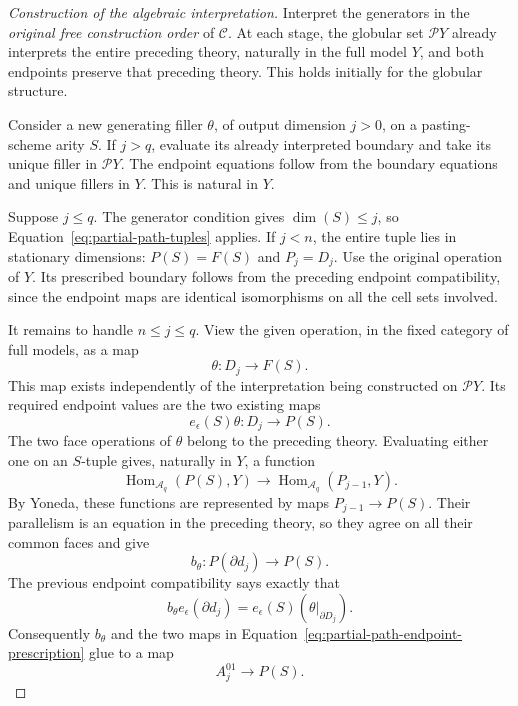 \documentclass[11pt,letterpaper]{article}
\numberwithin{equation}{section}
\theoremstyle{plain}
\theoremstyle{definition}
\theoremstyle{remark}
\DeclareMathOperator{\Hom}{Hom}
\begin{document}
\begin{proof}[Construction of the algebraic interpretation]
Interpret the generators in the \emph{original free construction order}
of \(\mathcal C\).  At each stage, the globular set
\(\mathcal P Y\) already interprets the entire preceding theory,
naturally in the full model \(Y\), and both endpoints preserve that
preceding theory.  This holds initially for the globular structure.

Consider a new generating filler \(\theta\), of output dimension
\(j>0\), on a pasting-scheme arity \(S\).  If \(j>q\),
evaluate its already interpreted boundary and take its unique filler
in \(\mathcal P Y\).  The endpoint equations follow from the
boundary equations and unique fillers in \(Y\).  This is natural
in \(Y\).

Suppose \(j\le q\).  The generator condition gives
\(\dim(S)\le j\), so Equation~\eqref{eq:partial-path-tuples}
applies.  If \(j<n\), the entire tuple lies in stationary
dimensions: \(P(S)=F(S)\) and \(P_j=D_j\).  Use the original
operation of \(Y\).  Its prescribed boundary follows from the
preceding endpoint compatibility, since the endpoint maps are identical
isomorphisms on all the cell sets involved.

It remains to handle \(n\le j\le q\).  View the given operation,
in the fixed category of full models, as a map
\[
                         \theta:D_j\longrightarrow F(S).
\]
This map exists independently of the interpretation being constructed
on \(\mathcal P Y\).  Its required endpoint values are the two
existing maps
\begin{equation}\label{eq:partial-path-endpoint-prescription}
             e_\epsilon(S)\theta:D_j\longrightarrow P(S).
\end{equation}
The two face operations of \(\theta\) belong to the preceding
theory.  Evaluating either one on an \(S\)-tuple gives, naturally
in \(Y\), a function
\[
 \Hom_{\mathcal A_q}(P(S),Y)
       \longrightarrow\Hom_{\mathcal A_q}(P_{j-1},Y).
\]
By Yoneda, these functions are represented by maps
\(P_{j-1}\to P(S)\).  Their parallelism is an equation in the
preceding theory, so they agree on all their common faces and give
\[
                 b_\theta:P(\partial d_j)\longrightarrow P(S).
\]
The previous endpoint compatibility says exactly that
\begin{equation}\label{eq:partial-path-boundary-compatibility}
 b_\theta e_\epsilon(\partial d_j)
       =e_\epsilon(S)(\theta|_{\partial D_j}).
\end{equation}
Consequently \(b_\theta\) and the two maps in
Equation~\eqref{eq:partial-path-endpoint-prescription} glue to a map
\begin{equation}\label{eq:partial-path-two-sided-prescription}
                         A_j^{01}\longrightarrow P(S).
\end{equation}


\end{proof}
\end{document}
